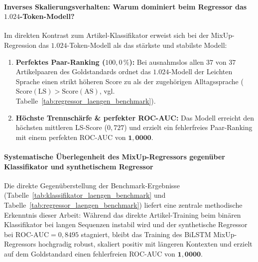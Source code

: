 \paragraph{Inverses Skalierungsverhalten: Warum dominiert beim Regressor das $1.024$-Token-Modell?}
Im direkten Kontrast zum Artikel-Klassifikator erweist sich bei der MixUp-Regression das $1.024$-Token-Modell als das stärkste und stabilste Modell:
\begin{enumerate}
    \item \textbf{Perfektes Paar-Ranking ($100{,}0\,\%$):} Bei ausnahmslos allen $37$ von $37$ Artikelpaaren des Goldstandards ordnet das $1.024$-Modell der Leichten Sprache einen strikt höheren Score zu als der zugehörigen Alltagssprache ($\text{Score}(\text{LS}) > \text{Score}(\text{AS})$, vgl. Tabelle~\ref{tab:regressor_laengen_benchmark}).
    \item \textbf{Höchste Trennschärfe \& perfekter ROC-AUC:} Das Modell erreicht den höchsten mittleren LS-Score ($0{,}727$) und erzielt ein fehlerfreies Paar-Ranking mit einem perfekten ROC-AUC von $\mathbf{1{,}0000}$.
\end{enumerate}

\paragraph{Systematische Überlegenheit des MixUp-Regressors gegenüber Klassifikator und synthetischem Regressor}
Die direkte Gegenüberstellung der Benchmark-Ergebnisse (Tabelle~\ref{tab:klassifikator_laengen_benchmark} und Tabelle~\ref{tab:regressor_laengen_benchmark}) liefert eine zentrale methodische Erkenntnis dieser Arbeit: Während das direkte Artikel-Training beim binären Klassifikator bei langen Sequenzen instabil wird und der synthetische Regressor bei $\text{ROC-AUC} = 0{,}8495$ stagniert, bleibt das Training des BiLSTM MixUp-Regressors hochgradig robust, skaliert positiv mit längeren Kontexten und erzielt auf dem Goldstandard einen fehlerfreien ROC-AUC von $\mathbf{1{,}0000}$.

